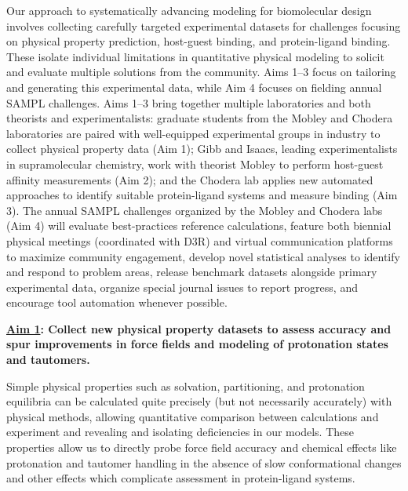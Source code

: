 \documentclass[11pt]{article}
\begin{document}
Our approach to systematically advancing modeling for biomolecular design involves collecting carefully targeted experimental datasets for challenges focusing on physical property prediction, host-guest binding, and protein-ligand binding.
These isolate individual limitations in quantitative physical modeling to solicit and evaluate multiple solutions from the community.
Aims 1--3 focus on tailoring and generating this experimental data, while Aim 4 focuses on fielding annual SAMPL challenges.
Aims 1--3 bring together multiple laboratories and both theorists and experimentalists: graduate students from the Mobley and Chodera laboratories are paired with well-equipped experimental groups in industry to collect physical property data (Aim 1); Gibb and Isaacs, leading experimentalists in supramolecular chemistry, work with theorist Mobley to perform host-guest affinity measurements (Aim 2); and the Chodera lab applies new automated approaches to identify suitable protein-ligand systems and measure binding (Aim 3).
The annual SAMPL challenges organized by the Mobley and Chodera labs (Aim 4) will evaluate best-practices reference calculations, feature both biennial physical meetings (coordinated with D3R) and virtual communication platforms to maximize community engagement, develop novel statistical analyses to identify and respond to problem areas, release benchmark datasets alongside primary experimental data, organize special journal issues to report progress, and encourage tool automation whenever possible.

\textbf{\underline{Aim 1}: Collect new physical property datasets to assess accuracy and spur improvements in force fields and modeling of protonation states and tautomers.} 


Simple physical properties such as solvation, partitioning, and protonation equilibria can be calculated quite precisely (but not necessarily accurately) with physical methods, allowing quantitative comparison between calculations and experiment and revealing and isolating deficiencies in our models. 
These properties allow us to directly probe force field accuracy and chemical effects like protonation and tautomer handling in the absence of slow conformational changes and other effects which complicate assessment in protein-ligand systems. 
\end{document}
